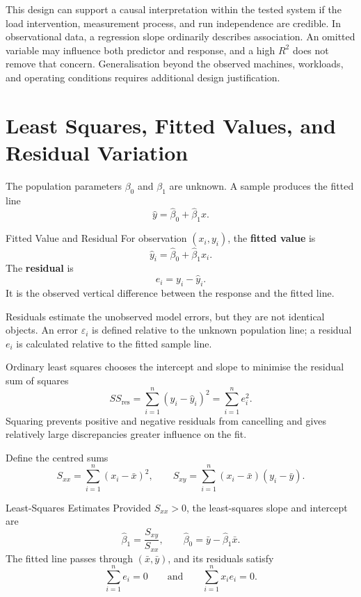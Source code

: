 This design can support a causal interpretation within the tested system if the load intervention, measurement process, and run independence are credible. In observational data, a regression slope ordinarily describes association. An omitted variable may influence both predictor and response, and a high $R^2$ does not remove that concern. Generalisation beyond the observed machines, workloads, and operating conditions requires additional design justification.

\section{Least Squares, Fitted Values, and Residual Variation}
\label{sec:regression-least-squares}

The population parameters $\beta_0$ and $\beta_1$ are unknown. A sample produces the fitted line
\[
\hat y=\hat\beta_0+\hat\beta_1x.
\]

\begin{definition}{Fitted Value and Residual}
For observation $(x_i,y_i)$, the \textbf{fitted value} is
\[
\hat y_i=\hat\beta_0+\hat\beta_1x_i.
\]
The \textbf{residual} is
\[
e_i=y_i-\hat y_i.
\]
It is the observed vertical difference between the response and the fitted line.
\end{definition}

Residuals estimate the unobserved model errors, but they are not identical objects. An error $\varepsilon_i$ is defined relative to the unknown population line; a residual $e_i$ is calculated relative to the fitted sample line.

Ordinary least squares chooses the intercept and slope to minimise the residual sum of squares
\[
SS_{\text{res}}
=\sum_{i=1}^{n}(y_i-\hat y_i)^2
=\sum_{i=1}^{n}e_i^2.
\]
Squaring prevents positive and negative residuals from cancelling and gives relatively large discrepancies greater influence on the fit.

Define the centred sums
\[
S_{xx}=\sum_{i=1}^{n}(x_i-\bar x)^2,
\qquad
S_{xy}=\sum_{i=1}^{n}(x_i-\bar x)(y_i-\bar y).
\]

\begin{theorem}{Least-Squares Estimates}
Provided $S_{xx}>0$, the least-squares slope and intercept are
\[
\hat\beta_1=\frac{S_{xy}}{S_{xx}},
\qquad
\hat\beta_0=\bar y-\hat\beta_1\bar x.
\]
The fitted line passes through $(\bar x,\bar y)$, and its residuals satisfy
\[
\sum_{i=1}^{n}e_i=0
\qquad\text{and}\qquad
\sum_{i=1}^{n}x_i e_i=0.
\]
\end{theorem}

